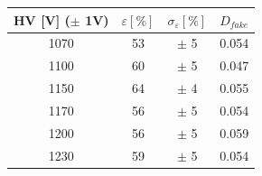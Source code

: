     \begin{tabular}{cccc}
    \toprule
    HV [V] ($\pm$ 1V) & $\varepsilon [\%]$ & $\sigma_{\varepsilon} [\%]$ & $D_{fake}$ \\
    \midrule
    1070 & 53 & $\pm$ 5 & 0.054 \\
    1100 & 60 & $\pm$ 5 & 0.047 \\
    1150 & 64 & $\pm$ 4 & 0.055 \\
    1170 & 56 & $\pm$ 5 & 0.054 \\
    1200 & 56 & $\pm$ 5 & 0.059 \\
    1230 & 59 & $\pm$ 5 & 0.054 \\
    \bottomrule
    \end{tabular}
